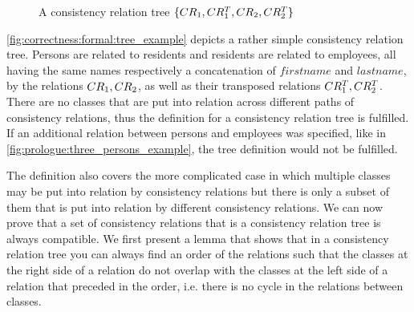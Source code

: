 \begin{figure}
    \centering
    
    \caption{A consistency relation tree $\{ CR_{1}, CR^T_{1}, CR_{2}, CR^T_{2} \}$}
    \label{fig:correctness:formal:tree_example}
\end{figure}

\begin{example}
\autoref{fig:correctness:formal:tree_example} depicts a rather simple consistency relation tree. 
Persons are related to residents and residents are related to employees, all having the same names respectively a concatenation of $firstname$ and $lastname$, by the relations $CR_{1}, CR_{2}$, as well as their transposed relations $CR^T_{1}, CR^T_{2}$.
There are no classes that are put into relation across different paths of consistency relations, thus the definition for a consistency relation tree is fulfilled. 
If an additional relation between persons and employees was specified, like in \autoref{fig:prologue:three_persons_example}, the tree definition would not be fulfilled.
\end{example}

The definition also covers the more complicated case in which multiple classes may be put into relation by consistency relations but there is only a subset of them that is put into relation by different consistency relations.
%
%
We can now prove that a set of consistency relations that is a consistency relation tree is always compatible.
We first present a lemma that shows that in a consistency relation tree you can always find an order of the relations such that the classes at the right side of a relation do not overlap with the classes at the left side of a relation that preceded in the order, i.e. there is no cycle in the relations between classes.

